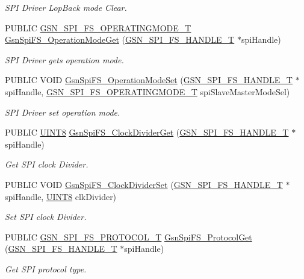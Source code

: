 \begin{DoxyCompactItemize}
\begin{DoxyCompactList}\small\item\em SPI Driver LopBack mode Clear. \end{DoxyCompactList}\item 
PUBLIC \hyperlink{a00655_gab173e44df6afa7f56b96f3a05cb857a5}{GSN\_\-SPI\_\-FS\_\-OPERATINGMODE\_\-T} \hyperlink{a00655_ga3245efe23f9fe2d50dec14bb095616d5}{GsnSpiFS\_\-OperationModeGet} (\hyperlink{a00234}{GSN\_\-SPI\_\-FS\_\-HANDLE\_\-T} $\ast$spiHandle)
\begin{DoxyCompactList}\small\item\em SPI Driver gets operation mode. \end{DoxyCompactList}\item 
PUBLIC VOID \hyperlink{a00655_gae3fcac3d6cd6790d11fcc2c53f1c8e67}{GsnSpiFS\_\-OperationModeSet} (\hyperlink{a00234}{GSN\_\-SPI\_\-FS\_\-HANDLE\_\-T} $\ast$spiHandle, \hyperlink{a00655_gab173e44df6afa7f56b96f3a05cb857a5}{GSN\_\-SPI\_\-FS\_\-OPERATINGMODE\_\-T} spiSlaveMasterModeSel)
\begin{DoxyCompactList}\small\item\em SPI Driver set operation mode. \end{DoxyCompactList}\item 
PUBLIC \hyperlink{a00660_gab27e9918b538ce9d8ca692479b375b6a}{UINT8} \hyperlink{a00655_ga53ad601dfca672c1500549b1d954229f}{GsnSpiFS\_\-ClockDividerGet} (\hyperlink{a00234}{GSN\_\-SPI\_\-FS\_\-HANDLE\_\-T} $\ast$spiHandle)
\begin{DoxyCompactList}\small\item\em Get SPI clock Divider. \end{DoxyCompactList}\item 
PUBLIC VOID \hyperlink{a00655_ga916d8712ea792188f5a9140cf5936f25}{GsnSpiFS\_\-ClockDividerSet} (\hyperlink{a00234}{GSN\_\-SPI\_\-FS\_\-HANDLE\_\-T} $\ast$spiHandle, \hyperlink{a00660_gab27e9918b538ce9d8ca692479b375b6a}{UINT8} clkDivider)
\begin{DoxyCompactList}\small\item\em Set SPI clock Divider. \end{DoxyCompactList}\item 
PUBLIC \hyperlink{a00655_gaa9b496d91ebb6c1e80cbd1b076c55f40}{GSN\_\-SPI\_\-FS\_\-PROTOCOL\_\-T} \hyperlink{a00655_ga8abe5bf5b320cfe2a1ba59d7db38219d}{GsnSpiFS\_\-ProtocolGet} (\hyperlink{a00234}{GSN\_\-SPI\_\-FS\_\-HANDLE\_\-T} $\ast$spiHandle)
\begin{DoxyCompactList}\small\item\em Get SPI protocol type. \end{DoxyCompactList}\item 

\end{DoxyCompactItemize}
